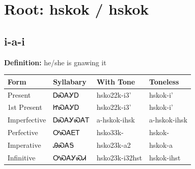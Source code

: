 \documentclass{article}%
\begin{document}
%
\normalsize%
\section*{Root: hskok / hskok}%
\subsection*{i-a-i}%
\textbf{Definition: }%
he/she is gnawing it%
\\[0.5em]%
\begin{tabular}{|l|l|l|l|}%
\hline%
\textbf{Form}&\textbf{Syllabary}&\textbf{With Tone}&\textbf{Toneless}\\%
\hline%
Present&ᎠᏍᎪᎩᎠ&hsko22k{-}i3'&hskok{-}i'\\%
1st Present&ᏥᏍᎪᎩᎠ&hsko22k{-}i3'&hskok{-}i'\\%
Imperfective&ᎠᏍᎪᎩᏍᎪᎢ&a{-}hskok{-}ihsk&a{-}hskok{-}ihsk\\%
Perfective&ᎤᏍᎪᎬᎢ&hsko33k{-}&hskok{-}\\%
Imperative&ᎯᏍᎪᎦ&hsko23k{-}a2&hskok{-}a\\%
Infinitive&ᎤᏍᎪᎩᏍᏗ&hsko23k{-}i32hst&hskok{-}ihst\\%
\hline%
\end{tabular}%
\\[1em]%
\end{document}
